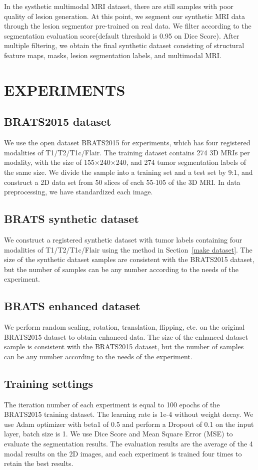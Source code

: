 \documentclass{ecai}
\begin{document}
In the systhetic multimodal MRI dataset, there are still samples with poor quality of lesion generation. At this point, we segment our synthetic MRI data through the lesion segmentor pre-trained on real data. We filter according to the segmentation evaluation score(default threshold is 0.95 on Dice Score). After multiple filtering, we obtain the final synthetic dataset consisting of structural feature maps, masks, lesion segmentation labels, and multimodal MRI.

\section{EXPERIMENTS}
\subsection{BRATS2015 dataset}
We use the open dataset BRATS2015\cite{91menze:hal-00935640} for experiments, which has four registered modalities of T1/T2/T1c/Flair. The training dataset contains 274 3D MRIs per modality, with the size of 155$\times$240$\times$240, and 274 tumor segmentation labels of the same size. We divide the sample into a training set and a test set by 9:1, and construct a 2D data set from 50 slices of each 55-105 of the 3D MRI. In data preprocessing, we have standardized each image.

\subsection{BRATS synthetic dataset}
We construct a registered synthetic dataset with tumor labels containing four modalities of T1/T2/T1c/Flair using the method in Section~\ref{make dataset}. The size of the synthetic dataset samples are consistent with the BRATS2015 dataset, but the number of samples can be any number according to the needs of the experiment.

\subsection{BRATS enhanced dataset}
We perform random scaling, rotation, translation, flipping, etc. on the original BRATS2015 dataset to obtain enhanced data. The size of the enhanced dataset sample is consistent with the BRATS2015 dataset, but the number of samples can be any number according to the needs of the experiment.

\subsection{Training settings}
The iteration number of each experiment is equal to 100 epochs of the BRATS2015 training dataset. The learning rate is 1e-4 without weight decay. We use Adam optimizer with beta1 of 0.5 and perform a Dropout of 0.1 on the input layer, batch size is 1. We use Dice Score \cite{95dice1945measures} and Mean Square Error (MSE)\cite{94prasad1990the} to evaluate the segmentation results. The evaluation results are the average of the 4 modal results on the 2D images, and each experiment is trained four times to retain the best results.
\end{document}
